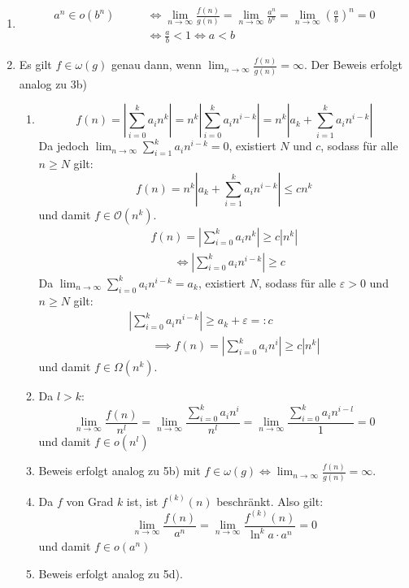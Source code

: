 \documentclass{scrartcl}
\begin{document}
\begin{enumerate}
\item
\begin{align*}
a^n\in o(b^n)
\qquad &\iff
\lim_{n\to\infty}\frac{f(n)}{g(n)}
=\lim_{n\to\infty}\frac{a^n}{b^n}
=\lim_{n\to\infty}\left(\frac ab\right)^n
=0\\
&\iff \frac ab<1
\iff a<b
\end{align*}

\item
\begin{lem*}
Es gilt $f\in\omega(g)$ genau dann, wenn $\lim_{n\to\infty}\frac{f(n)}{g(n)}=\infty$.
Der Beweis erfolgt analog zu 3b)
\end{lem*}
\begin{enumerate}
\item
\[
f(n) = \left|\sum_{i=0}^ka_in^k\right|
= n^k\left|\sum_{i=0}^ka_in^{i-k}\right|
= n^k\left|a_k+\sum_{i=1}^ka_in^{i-k}\right|
\]
Da jedoch $\lim_{n\to\infty}\sum_{i=1}^ka_in^{i-k}=0$, existiert $N$ und $c$, sodass für alle $n\ge N$ gilt:
\[
f(n)=n^k\left|a_k+\sum_{i=1}^ka_in^{i-k}\right|\le cn^k
\]
und damit $f\in\mathcal O(n^k)$.
\begin{align*}
f(n) = \left|\sum_{i=0}^ka_in^k\right|
\ge c\left|n^k\right|\\
\qquad \iff \left|\sum_{i=0}^ka_in^{i-k}\right| \ge c
\end{align*}
Da $\lim_{n\to\infty}\sum_{i=0}^ka_in^{i-k}=a_k$, existiert $N$, sodass für alle $\varepsilon>0$ und $n\ge N$ gilt:
\begin{align*}
\left|\sum_{i=0}^ka_in^{i-k}\right|
\ge a_k +\varepsilon =: c\\
\qquad \implies 
f(n) = \left|\sum_{i=0}^ka_in^i\right|
\ge c\left|n^k\right|
\end{align*}
und damit $f\in\Omega(n^k)$.

\item
Da $l>k$:
\[
\lim_{n\to\infty}\frac{f(n)}{n^l}
=\lim_{n\to\infty}\frac{\sum_{i=0}^ka_in^i}{n^l}
=\lim_{n\to\infty}\frac{\sum_{i=0}^ka_in^{i-l}}1 =0
\]
und damit $f\in o(n^l)$
\item
Beweis erfolgt analog zu 5b) mit $f\in\omega(g) \iff \lim_{n\to\infty}\frac{f(n)}{g(n)}=\infty$.
\item
Da $f$ von Grad $k$ ist, ist $f^{(k)}(n)$ beschränkt.
Also gilt:
\[
\lim_{n\to\infty}\frac{f(n)}{a^n}=
\lim_{n\to\infty}\frac{f^{(k)}(n)}{\ln^ka\cdot a^n}
=0
\]
und damit $f\in o(a^n)$
\item
Beweis erfolgt analog zu 5d).
\end{enumerate}
\end{enumerate}
\end{document}

